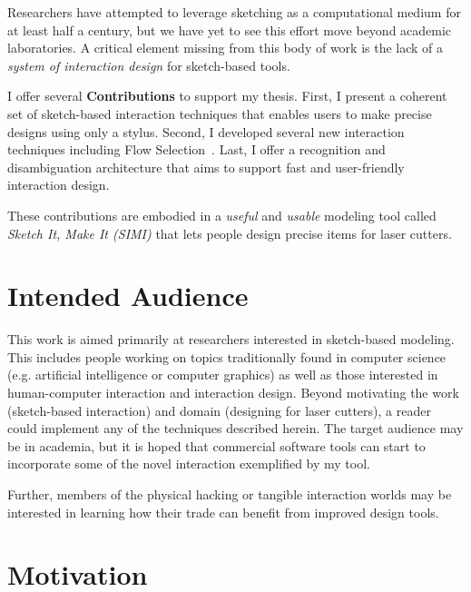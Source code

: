 Researchers have attempted to leverage sketching as a computational
medium for at least half a century, but we have yet to see this effort
move beyond academic laboratories. A critical element missing from
this body of work is the lack of a \textit{system of interaction
  design} for sketch-based tools.

I offer several \textbf{Contributions} to support my thesis. First, I
present a coherent set of sketch-based interaction techniques that
enables users to make precise designs using only a stylus. Second, I
developed several new interaction techniques including Flow
Selection~\cite{johnson-flow-selection}. Last, I offer a recognition
and disambiguation architecture that aims to support fast and
user-friendly interaction design.

These contributions are embodied in a \textit{useful} and
\textit{usable} modeling tool called \textit{Sketch It, Make It
  (SIMI)} that lets people design precise items for laser
cutters.

\section{Intended Audience}

This work is aimed primarily at researchers interested in sketch-based
modeling. This includes people working on topics traditionally found
in computer science (e.g. artificial intelligence or computer
graphics) as well as those interested in human-computer interaction
and interaction design. Beyond motivating the work (sketch-based
interaction) and domain (designing for laser cutters), a reader could
implement any of the techniques described herein. The target audience
may be in academia, but it is hoped that commercial software tools can
start to incorporate some of the novel interaction exemplified by my
tool.

Further, members of the physical hacking or tangible interaction
worlds may be interested in learning how their trade can benefit from
improved design tools.

\section{Motivation}

